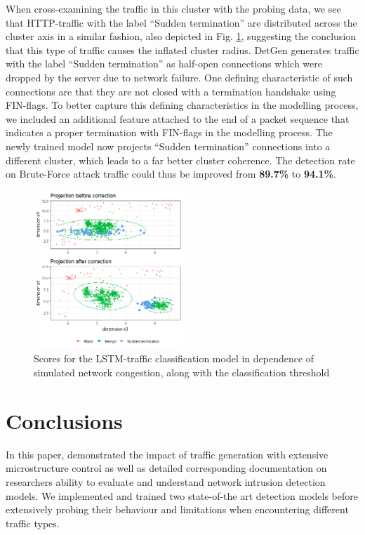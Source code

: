 \documentclass[10pt,conference]{IEEEtran}
\begin{document}
When cross-examining the traffic in this cluster with the probing data, we see that HTTP-traffic with the label \enquote{Sudden termination} are distributed across the cluster axis in a similar fashion, also depicted in Fig. \ref{fig:Subspace_projection}, suggesting the conclusion that this type of traffic causes the inflated cluster radius. DetGen generates traffic with the label \enquote{Sudden termination} as half-open connections which were dropped by the server due to network failure. One defining characteristic of such connections are that they are not closed with a termination handshake using FIN-flags. To better capture this defining characteristics in the modelling process, we included an additional feature attached to the end of a packet sequence that indicates a proper termination with FIN-flags in the modelling process.
The newly trained model now projects \enquote{Sudden termination} connections into a different cluster, which leads to a far better cluster coherence. The detection rate on Brute-Force attack traffic could thus be improved from \textbf{89.7\%} to \textbf{94.1\%}.

\begin{figure}
\centering
\includegraphics[width=0.5\textwidth]{images/Subspace_projection_new3.png}
\caption{Scores for the LSTM-traffic classification model in dependence of simulated network congestion, along with the classification threshold}\label{fig:Subspace_projection}
\end{figure}


\section{Conclusions}\label{Sec:Conclusion}

In this paper, demonstrated the impact of traffic generation with extensive microstructure control as well as detailed corresponding documentation on researchers ability to evaluate and understand network intrusion detection models. We implemented and trained two state-of-the art detection models before extensively probing their behaviour and limitations when encountering different traffic types. 
\end{document}

